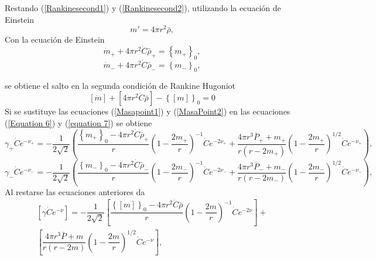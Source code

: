 \documentclass{article}
\begin{document}
    Restando (\ref{Rankinesecond1}) y (\ref{Rankinesecond2}), utilizando la ecuación de Einstein 
    \begin{equation}
        m'= 4\pi r^{2}\bar{\rho},
    \end{equation}
    Con la ecuación de Einstein
    \begin{equation}
        \dot{m}_{+}+ 4\pi r^{2}\dot{C}\bar{\rho}_{+}= \left \{ m_{+}  \right\}_{0},
        \label{Masapoint1}
    \end{equation}
    \begin{equation}
        \dot{m}_{-}+ 4\pi r^{2}\dot{C}\bar{\rho}_{-}= \left \{ m_{-}  \right\}_{0},
        \label{MasaPoint2}
    \end{equation}
    
    se obtiene el salto en la segunda condición de Rankine Hugoniot
    \begin{equation}
        \left[ \dot{m}\right] + \left[ 4\pi r^{2}\dot{C}\bar{\rho} \right] - \left \{ \left[ m \right]  \right \}_{0}=0
    \end{equation}
    Si se sustituye las ecuaciones (\ref{Masapoint1}) y (\ref{MasaPoint2}) en las ecuaciones (\ref{Equation 6}) y (\ref{equation 7}) se obtiene
    \begin{equation}
        \gamma_{+} \dot{C} e^{-\nu_{+}} = -\dfrac{1}{2\sqrt{2}}\left( \dfrac{ \left \{ m_{+} \right\}_{0}-4\pi r^{2}\dot{C}\bar{\rho}_{+}}{r}\left( 1-\dfrac{2m_{+}}{r}\right)^{-1} \dot{C}e^{-2\nu_{+}} + \dfrac{4\pi r^{3}\bar{P}_{+}+m_{+}}{r \left( r-2m_{+} \right)}\left(1-\dfrac{2m_{+}}{r} \right)^{1/2}\dot{C}e^{-\nu_{+}}\right), 
    \end{equation}
     \begin{equation}
         \gamma_{-} \dot{C} e^{-\nu_{-}} = -\dfrac{1}{2\sqrt{2}}\left( \dfrac{ \left \{ m_{-}  \right\}_{0}-4\pi r^{2}\dot{C}\bar{\rho}_{-}}{r}\left( 1-\dfrac{2m_{-}}{r}\right)^{-1} \dot{C}e^{-2\nu_{-}} + \dfrac{4\pi r^{3}\bar{P}_{-}+m_{-}}{r \left( r-2m_{-} \right)}\left(1-\dfrac{2m_{-}}{r} \right)^{1/2}\dot{C}e^{-\nu_{-}}\right), 
     \end{equation}
    Al restarse las ecuaciones anteriores da
    \begin{align}
     \left[   \gamma \dot{C} e^{-\nu} \right]= -\dfrac{1}{2\sqrt{2}}\left[ \dfrac{ \left \{\left[ m \right]  \right\}_{0}-4\pi r^{2}\dot{C}\bar{\rho}}{r}\left( 1-\dfrac{2m}{r}\right)^{-1} \dot{C}e^{-2\nu} \right] + \\ \left[ \dfrac{4\pi r^{3}\bar{P}+m}{r \left( r-2m \right)}\left(1-\dfrac{2m}{r} \right)^{1/2}\dot{C}e^{-\nu}\right],
     \label{Equation111}
    \end{align}
\end{document}
